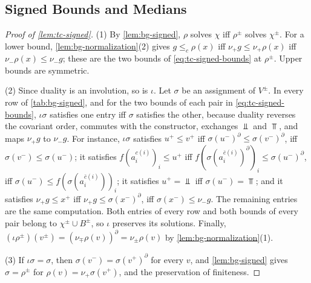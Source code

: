 \subsection{Signed Bounds and Medians}\label{app:tc-signed}

\begin{proof}[Proof of \cref{lem:tc-signed}]
(1) By \cref{lem:bg-signed}, $\rho$ solves $\chi$ iff $\rho^\pm$ solves
$\chi^\pm$. For a lower bound, \cref{lem:bg-normalization}(2) gives
$g\le_c\rho(x)$ iff $\nu_+g\le\nu_+\rho(x)$ iff $\nu_-\rho(x)\le\nu_-g$; these
are the two bounds of \cref{eq:tc-signed-bounds} at $\rho^\pm$. Upper bounds
are symmetric.

(2) Since duality is an involution, so is $\iota$. Let $\sigma$ be an assignment
of $V^\pm$. In every row of \cref{tab:bg-signed}, and for the two bounds of
each pair in \cref{eq:tc-signed-bounds}, $\iota\sigma$ satisfies one entry iff
$\sigma$ satisfies the other, because duality reverses the covariant order,
commutes with the constructor, exchanges $\Bot$ and $\Top$, and maps $\nu_+g$
to $\nu_-g$. For instance, $\iota\sigma$ satisfies $u^+\le v^+$ iff
$\sigma(u^-)^\partial\le\sigma(v^-)^\partial$, iff $\sigma(v^-)\le\sigma(u^-)$;
it satisfies $f(a_i^{c(i)})_i\le u^+$ iff
$f(\sigma(a_i^{\bar c(i)})^\partial)_i\le\sigma(u^-)^\partial$, iff
$\sigma(u^-)\le f(\sigma(a_i^{\bar c(i)}))_i$; it satisfies $u^+=\Bot$ iff
$\sigma(u^-)=\Top$; and it satisfies $\nu_+g\le x^+$ iff
$\nu_+g\le\sigma(x^-)^\partial$, iff $\sigma(x^-)\le\nu_-g$. The remaining
entries are the same computation. Both entries of every row and both bounds of
every pair belong to $\chi^\pm\cup B^\pm$, so $\iota$ preserves its solutions.
Finally, $(\iota\rho^\pm)(v^\pm)=(\nu_\mp\rho(v))^\partial=\nu_\pm\rho(v)$ by
\cref{lem:bg-normalization}(1).

(3) If $\iota\sigma=\sigma$, then $\sigma(v^-)=\sigma(v^+)^\partial$ for every $v$,
and \cref{lem:bg-signed} gives $\sigma=\rho^\pm$ for
$\rho(v)=\nu_+\sigma(v^+)$, and the preservation of finiteness.
\end{proof}

